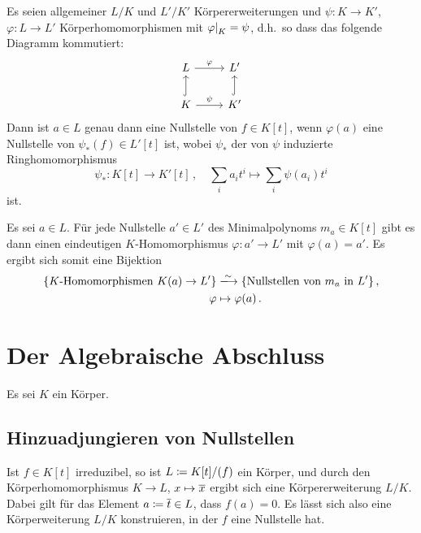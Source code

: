 \begin{remark}
  Es seien allgemeiner $L/K$ und $L'/K'$ Körpererweiterungen und $\psi \colon K \to K'$, $\varphi  \colon L \to L'$ Körperhomomorphismen mit $\restrict{\varphi }{K} = \psi$, d.h.\ so dass das folgende Diagramm kommutiert:
  \[
    \begin{tikzcd}
        L
        \arrow{r}[above]{\varphi}
      & L'
      \\
        K
        \arrow[hook]{u}
        \arrow{r}[above]{\psi}
      & K'
        \arrow[hook]{u}
    \end{tikzcd}
  \]
  Dann ist $a \in L$ genau dann eine Nullstelle von $f \in K[t]$, wenn $\varphi(a)$ eine Nullstelle von $\psi_*(f) \in L'[t]$ ist, wobei $\psi_*$ der von $\psi$ induzierte Ringhomomorphismus
  \[
            \psi_*
    \colon  K[t]
    \to     K'[t] \,,
    \quad   \sum_i a_i t^i
    \mapsto \sum_i \psi(a_i) t^i
  \]
  ist.
\end{remark}

\begin{proposition}
  Es sei $a \in L$.
  Für jede Nullstelle $a' \in L'$ des Minimalpolynoms $m_a \in K[t]$ gibt es dann einen eindeutigen $K$-Homomorphismus $\varphi \colon a' \to L'$ mit $\varphi(a) = a'$.
  Es ergibt sich somit eine Bijektion
  \begin{align*}
                            \{ \text{$K$-Homomorphismen $K(a) \to L'$} \}
    &\xlongrightarrow{\sim} \{ \text{Nullstellen von $m_a$ in $L'$} \} \,,  \\
                            \varphi
    &\mapsto                \varphi(a) \,.
  \end{align*}
\end{proposition}





\section{Der Algebraische Abschluss}

Es sei $K$ ein Körper.



\subsection{Hinzuadjungieren von Nullstellen}

Ist $f \in K[t]$ irreduzibel, so ist $L \coloneqq K[t]/(f)$ ein Körper, und durch den Körperhomomorphismus $K \to L$, $x \mapsto \overline{x}$ ergibt sich eine Körpererweiterung $L/K$.
Dabei gilt für das Element $a \coloneqq \overline{t} \in L$, dass $f(a) = 0$.
Es lässt sich also eine Körperweiterung $L/K$ konstruieren, in der $f$ eine Nullstelle hat.



